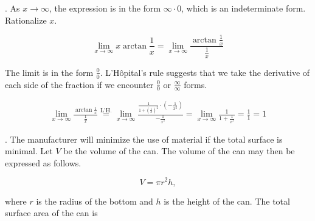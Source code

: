 \documentclass{article}
\begin{document}
\hfill

\begin{center}
\end{center}

\newpage

. As $x\to\infty$, the expression is in the form $\infty\cdot 0$, which is an indeterminate form. Rationalize $x$.

\[\lim_{x\to\infty}x\arctan\frac1x=\lim_{x\to\infty}\frac{\displaystyle\arctan\frac1x}{\displaystyle\frac1x}\]

\hfill

\noindent The limit is in the form $\displaystyle\frac00$. L'Hôpital's rule suggests that we take the derivative of each side of the fraction if we encounter $\displaystyle\frac00$ or $\displaystyle\frac\infty\infty$ forms.

\begin{align*}\lim_{x\to\infty}\frac{\displaystyle\arctan\frac1x}{\displaystyle\frac1x}\overset{\text{L'H.}}{=}\lim_{x\to\infty}\frac{\displaystyle\frac1{1+\left(\frac1x\right)^2}\cdot\left(-\frac1{x^2}\right)}{\displaystyle-\frac1{x^2}}=\lim_{x\to\infty}\frac1{\displaystyle1+\frac1{x^2}}=\frac11=\boxed{1}\end{align*}

\hfill

. The manufacturer will minimize the use of material if the total surface is minimal. Let $V$ be the volume of the can. The volume of the can may then be expressed as follows.

\[V=\pi r^2h,\]

\hfill

\noindent where $r$ is the radius of the bottom and $h$ is the height of the can. The total surface area of the can is
\end{document}
